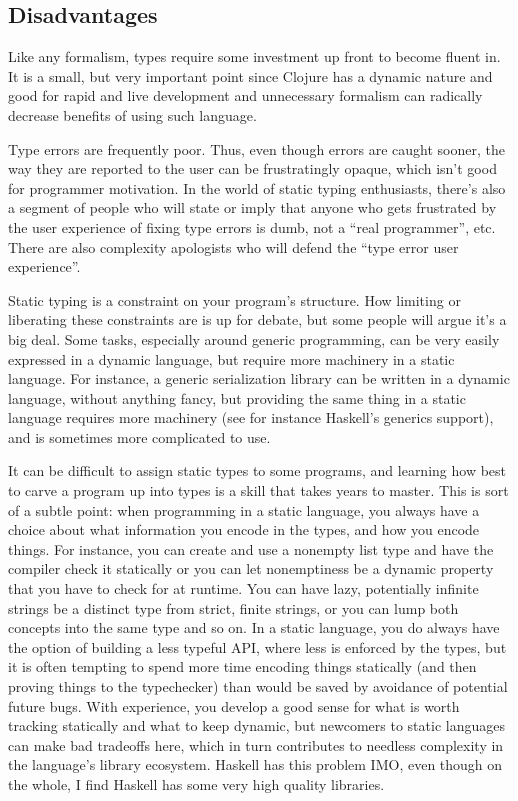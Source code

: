 \subsection{Disadvantages}

Like any formalism, types require some investment up front to become fluent in.
It is a small, but very important point since Clojure has a dynamic nature and
good for rapid and live development and unnecessary formalism can radically
decrease benefits of using such language.

Type errors are frequently poor. Thus, even though errors are caught sooner, the
way they are reported to the user can be frustratingly opaque, which isn’t good
for programmer motivation. In the world of static typing enthusiasts, there’s
also a segment of people who will state or imply that anyone who gets frustrated
by the user experience of fixing type errors is dumb, not a “real programmer”,
etc. There are also complexity apologists who will defend the “type error user
experience”.

Static typing is a constraint on your program’s structure. How limiting or
liberating these constraints are is up for debate, but some people will argue
it’s a big deal. Some tasks, especially around generic programming, can be very
easily expressed in a dynamic language, but require more machinery in a static
language. For instance, a generic serialization library can be written in a
dynamic language, without anything fancy, but providing the same thing in a
static language requires more machinery (see for instance Haskell’s generics
support), and is sometimes more complicated to use.

It can be difficult to assign static types to some programs, and learning how
best to carve a program up into types is a skill that takes years to master.
This is sort of a subtle point: when programming in a static language, you
always have a choice about what information you encode in the types, and how you
encode things. For instance, you can create and use a nonempty list type and
have the compiler check it statically or you can let nonemptiness be a dynamic
property that you have to check for at runtime. You can have lazy, potentially
infinite strings be a distinct type from strict, finite strings, or you can lump
both concepts into the same type and so on. In a static language, you do always
have the option of building a less typeful API, where less is enforced by the
types, but it is often tempting to spend more time encoding things statically
(and then proving things to the typechecker) than would be saved by avoidance of
potential future bugs. With experience, you develop a good sense for what is
worth tracking statically and what to keep dynamic, but newcomers to static
languages can make bad tradeoffs here, which in turn contributes to needless
complexity in the language’s library ecosystem. Haskell has this problem IMO,
even though on the whole, I find Haskell has some very high quality libraries.

